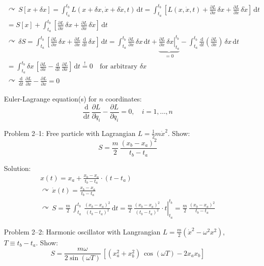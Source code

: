 \documentclass[fontsize=11pt,a4paper]{scrartcl}
\begin{document}
\begin{gather*}
	\curvearrowright\, S[x+\delta x]=\int_{t_a}^{t_b} L(x+\delta x,\dot x+\delta\dot x,t)\,\mathrm{d}t=\int_{t_a}^{t_b} \left[L(x,\dot x,t)+\frac{\partial L}{\partial x}\,\delta x+\frac{\partial L}{\partial \dot x}\,\delta\dot x\right]\,\mathrm{d}t\\
	=S[x]+\int_{t_a}^{t_b} \left[\frac{\partial L}{\partial x}\,\delta x+\frac{\partial L}{\partial\dot x}\,\delta\dot x\right]\,\mathrm{d}t\\
	\curvearrowright\,\delta S=\int_{t_a}^{t_b} \left[\frac{\partial L}{\partial x}\,\delta x+\frac{\partial L}{\partial\dot x}\,\frac{\mathrm{d}}{\mathrm{d}t}\,\delta x\right]\,\mathrm{d}t=\int_{t_a}^{t_b} \frac{\partial L}{\partial x}\,\delta x\,\mathrm{d}t+\underbrace{\left.\frac{\partial L}{\partial\dot x}\,\delta x\right|_{t_a}^{t_b}}_{=0}-\int_{t_a}^{t_b} \frac{\mathrm{d}}{\mathrm{d}t}\left(\frac{\partial L}{\partial\dot x}\right)\,\delta x\,\mathrm{d}t\\
	=\int_{t_a}^{t_b}\delta x\,\left[\frac{\partial L}{\partial x}-\frac{\mathrm{d}}{\mathrm{d}t}\,\frac{\partial L}{\partial \dot x}\right]\,\mathrm{d}t\stackrel{!}{=}0\quad\text{for arbitrary }\delta x\\
	\curvearrowright\,\frac{\mathrm{d}}{\mathrm{d}t}\,\frac{\partial L}{\partial\dot x}-\frac{\partial L}{\partial x}=0
\end{gather*}

Euler-Lagrange equation(s) for $n$ coordinates:
\[
	\frac{\mathrm{d}}{\mathrm{d}t}\,\frac{\partial L}{\partial \dot q_i}-\frac{\partial L}{\partial q_i}=0,\quad i=1,\dots,n
\]

Problem 2--1: Free particle with Lagrangian $L=\frac{1}{2}m\dot x^2$. Show:
\[
	S=\frac{m}{2}\,\frac{(x_b-x_a)^2}{t_b-t_a}
\]

Solution:
\begin{gather*}
	x(t)=x_a+\frac{x_b-x_a}{t_b-t_a}\cdot (t-t_a)\\
	\curvearrowright\,\dot x(t)=\frac{x_b-x_a}{t_b-t_a}\\
	\curvearrowright\,S=\frac{m}{2}\,\int_{t_a}^{t_b}\,\frac{(x_b-x_a)^2}{(t_b-t_a)^2}\,\mathrm{d}t=\frac{m}{2}\,\left.\frac{(x_b-x_a)^2}{(t_b-t_a)^2}\cdot t\right|_{t_a}^{t_b}=\frac{m}{2}\,\frac{(x_b-x_a)^2}{t_b-t_a}
\end{gather*}

Problem 2--2: Harmonic oscillator with Langrangian $L=\frac{m}{2}(\dot x^2-\omega^2 x^2)$, $T\equiv t_b-t_a$. Show:
\[
	S=\frac{m\omega}{2\sin(\omega T)}\,\left[(x_a^2+x_b^2)\,\cos(\omega T)-2x_a x_b\right]
\]
\end{document}
